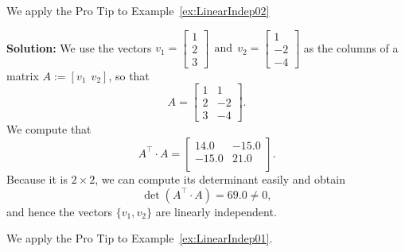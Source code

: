\vspace*{.1cm}

\begin{example} 
\label{ex:LinearIndep04} We apply the Pro Tip to Example~\ref{ex:LinearIndep02}
\end{example}

\textbf{Solution:} We use the vectors $ v_1 = \left[ \begin{array}{r} 1 \\2\\  3 \end{array} \right]~~\text{and}~~ v_2 = \left[ \begin{array}{r}  1 \\ -2  \\-4  \end{array} \right] $ 
as the columns of a matrix $ A:=[ v_1 ~~v_2]$, so that 
$$A=\left[ \begin{array}{rr} 1 & 1\\2 & -2\\  3 & -4\end{array} \right]. $$
We compute that
$$
A^\top \cdot A = \left[
\begin{array}{rr}
14.0 & -15.0 \\
-15.0 & 21.0 \\
\end{array}
\right].
$$
Because it is $2\times 2$, we can compute its determinant easily and obtain 
$$ \det(A^\top \cdot A)=69.0 \neq 0,$$
and hence the vectors $\{ v_1, v_2\}$ are linearly independent. 
\Qed
\vspace*{.5cm}

\begin{example} 
\label{ex:LinearIndep05} We apply the Pro Tip to Example~\ref{ex:LinearIndep01}. 
\end{example}

